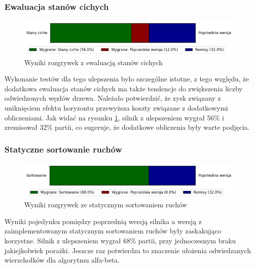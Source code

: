 \subsubsection{Ewaluacja stanów cichych}
\begin{figure}[ht]
    \centering
    \includegraphics[width=1\linewidth]{rozdzialy/rozdzial03/1_porownanie-wersji-silnika/rysunki/wyniki-stany-ciche}
    \caption{Wyniki rozgrywek z ewaluacją stanów cichych}
    \label{fig:wyniki-stany-ciche}
\end{figure}
Wykonanie testów dla tego ulepszenia było szczególne istotne, z tego względu, że dodatkowa ewaluacja stanów cichych ma także tendencje do zwiększenia liczby odwiedzonych węzłów drzewa.
Należało potwierdzić, że zysk związany z uniknięciem efektu horyzontu przewyższa koszty związane z dodatkowymi obliczeniami.
Jak widać na rysunku \ref{fig:wyniki-stany-ciche}, silnik z ulepszeniem wygrał 56\% i zremisował 32\% partii, co sugeruje, że dodatkowe obliczenia były warte podjęcia.

\subsubsection{Statyczne sortowanie ruchów}

\begin{figure}[ht]
    \centering
    \includegraphics[width=1\linewidth]{rozdzialy/rozdzial03/1_porownanie-wersji-silnika/rysunki/wyniki-sortowanie}
    \caption{Wyniki rozgrywek ze statycznym sortowaniem ruchów}
    \label{fig:wyniki-sortowanie}
\end{figure}
Wyniki pojedynku pomiędzy poprzednią wersją silnika a wersją z zaimplementowanym statycznym sortowaniem ruchów były zaskakująco korzystne.
Silnik z ulepszeniem wygrał 68\% partii, przy jednoczesnym braku jakiejkolwiek porażki.
Jeszcze raz potwierdza to znaczenie ułożenia odwiedzanych wierzchołków dla algorytmu alfa-beta.

